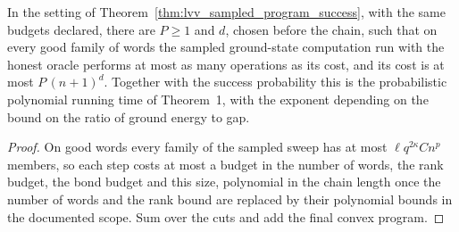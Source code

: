 \begin{lemma}
    \label{thm:lvv_sampled_program_cost}
    \leanok
    In the setting of Theorem~\ref{thm:lvv_sampled_program_success}, with the
    same budgets declared, there are $P\ge1$ and $d$, chosen before the chain,
    such that on every good family of words the sampled ground-state computation
    run with the honest oracle performs at most as many operations as its cost,
    and its cost is at most $P\,(n+1)^d$. Together with the success probability
    this is the probabilistic polynomial running time of Theorem~1, with the
    exponent depending on the bound on the ratio of ground energy to gap.
\end{lemma}
\begin{proof}
    \leanok
    On good words every family of the sampled sweep has at most $\ell q^{2\kappa}
        Cn^p$ members, so each step costs at most a budget in the number of words,
    the rank budget, the bond budget and this size, polynomial in the chain
    length once the number of words and the rank bound are replaced by their
    polynomial bounds in the documented scope. Sum over the cuts and add the
    final convex program.
\end{proof}

